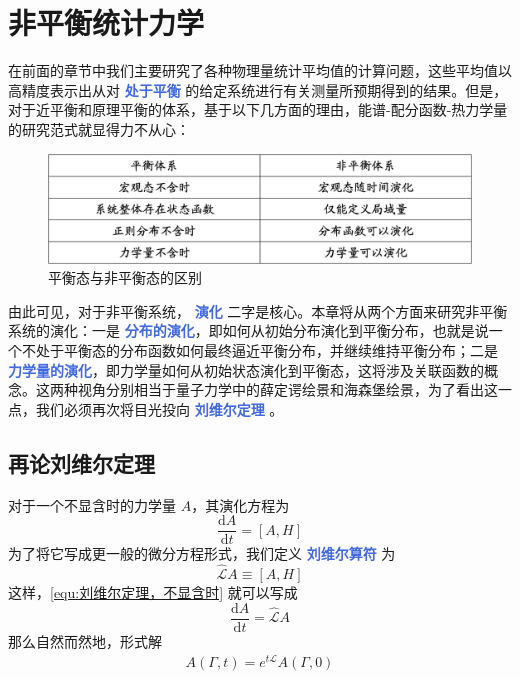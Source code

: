 \chapter{非平衡统计力学}

在前面的章节中我们主要研究了各种物理量统计平均值的计算问题，这些平均值以高精度表示出从对 \textcolor{RoyalBlue}{\textbf{\kaishu 处于平衡}} 的给定系统进行有关测量所预期得到的结果。但是，对于近平衡和原理平衡的体系，基于以下几方面的理由，能谱-配分函数-热力学量的研究范式就显得力不从心：

\begin{figure}[ht]
    \centering
    \includegraphics[width=1\textwidth]{figures/equ-nonequ.png}
    \caption{\kaishu 平衡态与非平衡态的区别}
    \label{fig:equ-nonequ}
\end{figure}

由此可见，对于非平衡系统， \textcolor{RoyalBlue}{\textbf{\kaishu 演化}} 二字是核心。本章将从两个方面来研究非平衡系统的演化：一是 \textcolor{RoyalBlue}{\textbf{\kaishu 分布的演化}}，即如何从初始分布演化到平衡分布，也就是说一个不处于平衡态的分布函数如何最终逼近平衡分布，并继续维持平衡分布；二是 \textcolor{RoyalBlue}{\textbf{\kaishu 力学量的演化}}，即力学量如何从初始状态演化到平衡态，这将涉及关联函数的概念。这两种视角分别相当于量子力学中的薛定谔绘景和海森堡绘景，为了看出这一点，我们必须再次将目光投向 \textcolor{RoyalBlue}{\textbf{\kaishu 刘维尔定理}} 。

\section{再论刘维尔定理}\label{sec:再论刘维尔定理}

对于一个不显含时的力学量 $A$，其演化方程为
\begin{equation}\label{equ:刘维尔定理，不显含时}
    \frac{\mathrm{d} A}{\mathrm{d} t} =  [A, H]
\end{equation}
为了将它写成更一般的微分方程形式，我们定义 \textcolor{RoyalBlue}{\textbf{\kaishu 刘维尔算符}} 为
\begin{equation}\label{equ:刘维尔算符}
    \mathcal{\hat L}A \equiv [A, H]
\end{equation}
这样，\eqref{equ:刘维尔定理，不显含时} 就可以写成
\begin{equation}\label{equ:刘维尔定理，不显含时，微分方程形式}
    \frac{\mathrm{d} A}{\mathrm{d} t} =  \mathcal{\hat L}A
\end{equation}
那么自然而然地，形式解
\begin{equation}\label{equ:形式解}
    A(\Gamma,t) = e^{t\mathcal{\hat L}}A(\Gamma,0)
\end{equation}

